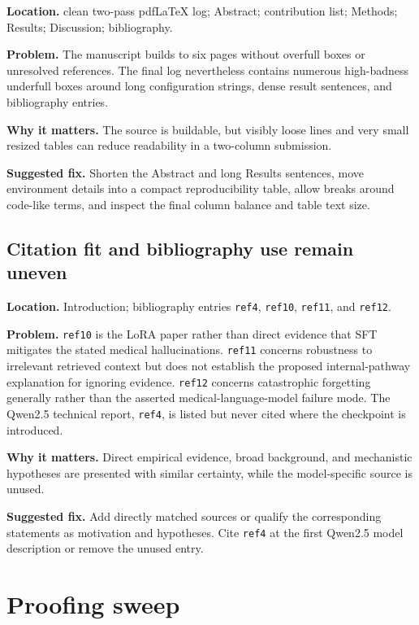\documentclass[11pt]{article}
\newcommand{\findinglabel}[1]{\textbf{#1}}
\begin{document}
\findinglabel{Location.} clean two-pass pdfLaTeX log; Abstract; contribution list; Methods; Results; Discussion; bibliography.

\findinglabel{Problem.} The manuscript builds to six pages without overfull boxes or unresolved references.  The final log nevertheless contains numerous high-badness underfull boxes around long configuration strings, dense result sentences, and bibliography entries.

\findinglabel{Why it matters.} The source is buildable, but visibly loose lines and very small resized tables can reduce readability in a two-column submission.

\findinglabel{Suggested fix.} Shorten the Abstract and long Results sentences, move environment details into a compact reproducibility table, allow breaks around code-like terms, and inspect the final column balance and table text size.

\subsection*{Citation fit and bibliography use remain uneven}

\findinglabel{Location.} Introduction; bibliography entries \texttt{ref4}, \texttt{ref10}, \texttt{ref11}, and \texttt{ref12}.

\findinglabel{Problem.} \texttt{ref10} is the LoRA paper rather than direct evidence that SFT mitigates the stated medical hallucinations.  \texttt{ref11} concerns robustness to irrelevant retrieved context but does not establish the proposed internal-pathway explanation for ignoring evidence.  \texttt{ref12} concerns catastrophic forgetting generally rather than the asserted medical-language-model failure mode.  The Qwen2.5 technical report, \texttt{ref4}, is listed but never cited where the checkpoint is introduced.

\findinglabel{Why it matters.} Direct empirical evidence, broad background, and mechanistic hypotheses are presented with similar certainty, while the model-specific source is unused.

\findinglabel{Suggested fix.} Add directly matched sources or qualify the corresponding statements as motivation and hypotheses.  Cite \texttt{ref4} at the first Qwen2.5 model description or remove the unused entry.

\section*{Proofing sweep}
\end{document}
